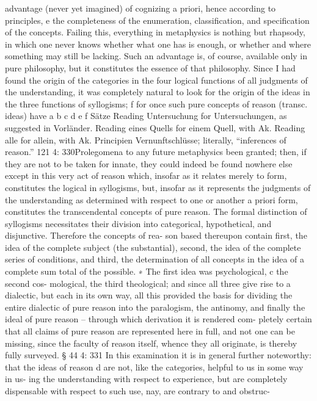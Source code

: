 advantage (never yet imagined) of cognizing a priori, hence according
to principles, e the completeness of the enumeration, classiﬁcation, and
speciﬁcation of the concepts. Failing this, everything in metaphysics
is nothing but rhapsody, in which one never knows whether what one
has is enough, or whether and where something may still be lacking.
Such an advantage is, of course, available only in pure philosophy, but
it constitutes the essence of that philosophy.
Since I had found the origin of the categories in the four logical
functions of all judgments of the understanding, it was completely
natural to look for the origin of the ideas in the three functions of
syllogisms; f for once such pure concepts of reason (transc. ideas) have
a
b
c
d
e
f
Sätze
Reading Untersuchung for Untersuchungen, as suggested in Vorländer.
Reading eines Quells for einem Quell, with Ak.
Reading alle for allein, with Ak.
Principien
Vernunftschlüsse; literally, “inferences of reason.”
121
4: 330Prolegomena to any future metaphysics
been granted; then, if they are not to be taken for innate, they could
indeed be found nowhere else except in this very act of reason which,
insofar as it relates merely to form, constitutes the logical in syllogisms,
but, insofar as it represents the judgments of the understanding as
determined with respect to one or another a priori form, constitutes the
transcendental concepts of pure reason.
The formal distinction of syllogisms necessitates their division into
categorical, hypothetical, and disjunctive. Therefore the concepts of rea-
son based thereupon contain ﬁrst, the idea of the complete subject (the
substantial), second, the idea of the complete series of conditions, and
third, the determination of all concepts in the idea of a complete sum
total of the possible. ∗ The ﬁrst idea was psychological, c the second cos-
mological, the third theological; and since all three give rise to a dialectic,
but each in its own way, all this provided the basis for dividing the entire
dialectic of pure reason into the paralogism, the antinomy, and ﬁnally
the ideal of pure reason – through which derivation it is rendered com-
pletely certain that all claims of pure reason are represented here in full,
and not one can be missing, since the faculty of reason itself, whence
they all originate, is thereby fully surveyed.
§ 44
4: 331
In this examination it is in general further noteworthy: that the ideas
of reason d are not, like the categories, helpful to us in some way in us-
ing the understanding with respect to experience, but are completely
dispensable with respect to such use, nay, are contrary to and obstruc-
